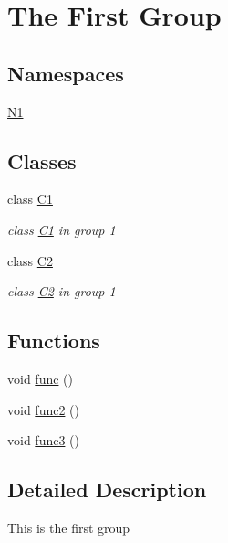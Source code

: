 \hypertarget{group__group1}{}\section{The First Group}
\label{group__group1}
\subsection*{Namespaces}
\begin{DoxyCompactItemize}
\item 
 \mbox{\hyperlink{namespace_n1}{N1}}
\end{DoxyCompactItemize}
\subsection*{Classes}
\begin{DoxyCompactItemize}
\item 
class \mbox{\hyperlink{class_c1}{C1}}
\begin{DoxyCompactList}\small\item\em class \mbox{\hyperlink{class_c1}{C1}} in group 1 \end{DoxyCompactList}\item 
class \mbox{\hyperlink{class_c2}{C2}}
\begin{DoxyCompactList}\small\item\em class \mbox{\hyperlink{class_c2}{C2}} in group 1 \end{DoxyCompactList}\end{DoxyCompactItemize}
\subsection*{Functions}
\begin{DoxyCompactItemize}
\item 
void \mbox{\hyperlink{group__group1_ga24f647174760cac13d2624b5ad74b00c}{func}} ()
\item 
void \mbox{\hyperlink{group__group1_ga053929c0809a5f56f7548fd7d9968f31}{func2}} ()
\item 
void \mbox{\hyperlink{group__group1_gadbf675591ff057ec48ce35b0d5cdf755}{func3}} ()
\end{DoxyCompactItemize}


\subsection{Detailed Description}
This is the first group

